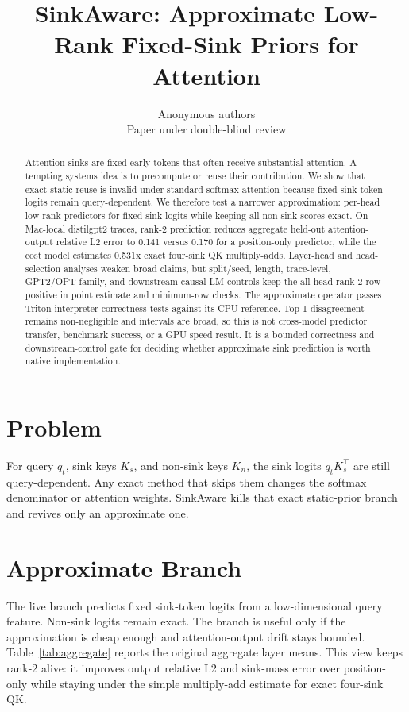\documentclass{article}
\title{SinkAware: Approximate Low-Rank Fixed-Sink Priors for Attention}
\author{Anonymous authors\\Paper under double-blind review}
\begin{document}
\maketitle

\begin{abstract}
Attention sinks are fixed early tokens that often receive substantial attention. A tempting systems idea is to precompute or reuse their contribution. We show that exact static reuse is invalid under standard softmax attention because fixed sink-token logits remain query-dependent. We therefore test a narrower approximation: per-head low-rank predictors for fixed sink logits while keeping all non-sink scores exact. On Mac-local distilgpt2 traces, rank-2 prediction reduces aggregate held-out attention-output relative L2 error to 0.141 versus 0.170 for a position-only predictor, while the cost model estimates 0.531x exact four-sink QK multiply-adds. Layer-head and head-selection analyses weaken broad claims, but split/seed, length, trace-level, GPT2/OPT-family, and downstream causal-LM controls keep the all-head rank-2 row positive in point estimate and minimum-row checks. The approximate operator passes Triton interpreter correctness tests against its CPU reference. Top-1 disagreement remains non-negligible and intervals are broad, so this is not cross-model predictor transfer, benchmark success, or a GPU speed result. It is a bounded correctness and downstream-control gate for deciding whether approximate sink prediction is worth native implementation.
\end{abstract}

\section{Problem}

For query $q_t$, sink keys $K_s$, and non-sink keys $K_n$, the sink logits $q_tK_s^\top$ are still query-dependent. Any exact method that skips them changes the softmax denominator or attention weights. SinkAware kills that exact static-prior branch and revives only an approximate one.

\section{Approximate Branch}

The live branch predicts fixed sink-token logits from a low-dimensional query feature. Non-sink logits remain exact. The branch is useful only if the approximation is cheap enough and attention-output drift stays bounded. Table~\ref{tab:aggregate} reports the original aggregate layer means. This view keeps rank-2 alive: it improves output relative L2 and sink-mass error over position-only while staying under the simple multiply-add estimate for exact four-sink QK.
\end{document}
